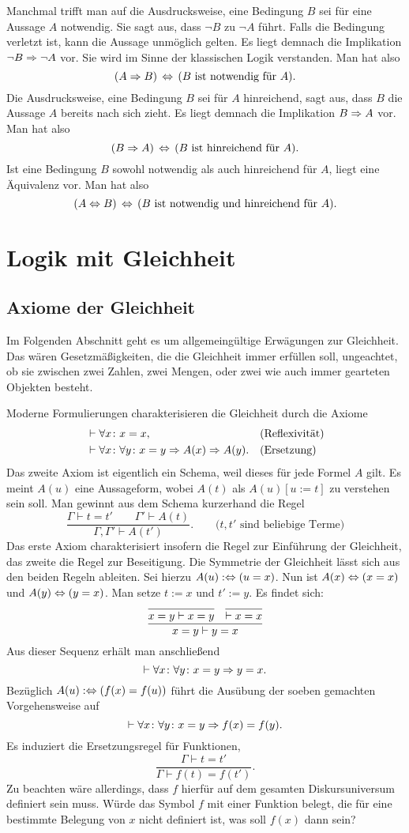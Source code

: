 Manchmal trifft man auf die Ausdrucksweise, eine Bedingung $B$ sei für
eine Aussage $A$ notwendig. Sie sagt aus, dass $\lnot B$ zu $\lnot A$
führt. Falls die Bedingung verletzt ist, kann die Aussage unmöglich
gelten. Es liegt demnach die Implikation $\lnot B\Rightarrow\lnot A$ vor.
Sie wird im Sinne der klassischen Logik verstanden. Man hat also
\[(A\Rightarrow B)\,\Leftrightarrow\, (\text{$B$ ist notwendig für $A$}).\]
Die Ausdrucksweise, eine Bedingung $B$ sei für $A$ hinreichend,
sagt aus, dass $B$ die Aussage $A$ bereits nach sich zieht. Es liegt
demnach die Implikation $B\Rightarrow A$ vor. Man hat also
\[(B\Rightarrow A)\,\Leftrightarrow\, (\text{$B$ ist hinreichend für $A$}).\]
Ist eine Bedingung $B$ sowohl notwendig als auch hinreichend für $A$,
liegt eine Äquivalenz vor. Man hat also
\[(A\Leftrightarrow B)\,\Leftrightarrow\, (\text{$B$ ist notwendig und hinreichend für $A$}).\]

\newpage
\section{Logik mit Gleichheit}

\subsection{Axiome der Gleichheit}

Im Folgenden Abschnitt geht es um allgemeingültige Erwägungen zur
Gleichheit. Das wären Gesetzmäßigkeiten, die die Gleichheit immer
erfüllen soll, ungeachtet, ob sie zwischen zwei Zahlen, zwei Mengen,
oder zwei wie auch immer gearteten Objekten besteht.

Moderne Formulierungen charakterisieren die Gleichheit durch die Axiome
\begin{align*}
&\vdash\forall x\colon x=x, &&\text{(Reflexivität)}\\
&\vdash\forall x\colon\forall y\colon x=y\Rightarrow A(x)\Rightarrow A(y).
&&\text{(Ersetzung)}
\end{align*}
Das zweite Axiom ist eigentlich ein Schema, weil dieses für jede
Formel $A$ gilt. Es meint $A(u)$ eine Aussageform, wobei $A(t)$ als
$A(u)[u:=t]$ zu verstehen sein soll. Man gewinnt aus dem Schema
kurzerhand die Regel
\[\dfrac{\Gamma\vdash t=t'\qquad\Gamma'\vdash A(t)}
{\Gamma,\Gamma'\vdash A(t')}.\qquad\text{($t,t'$ sind beliebige Terme)}\]
Das erste Axiom charakterisiert insofern die Regel zur Einführung
der Gleichheit, das zweite die Regel zur Beseitigung. Die Symmetrie
der Gleichheit lässt sich aus den beiden Regeln ableiten. Sei hierzu
$A(u):\Leftrightarrow (u=x)$. Nun ist $A(x)\Leftrightarrow (x=x)$ und
$A(y)\Leftrightarrow (y=x)$. Man setze $t:=x$ und $t':=y$. Es findet sich:
\[
\infer{x=y\vdash y=x}{
  \infer{x=y\vdash x=y}{}
& \infer{\vdash x=x}{}}
\]
Aus dieser Sequenz erhält man anschließend
\[\vdash\forall x\colon\forall y\colon x=y\Rightarrow y=x.\]
Bezüglich $A(u):\Leftrightarrow (f(x)=f(u))$ führt die Ausübung der soeben
gemachten Vorgehensweise auf
\[\vdash\forall x\colon\forall y\colon x=y\Rightarrow f(x)=f(y).\]
Es induziert die Ersetzungsregel für Funktionen,
\[\dfrac{\Gamma\vdash t=t'}{\Gamma\vdash f(t)=f(t')}.\]
Zu beachten wäre allerdings, dass $f$ hierfür auf dem gesamten
Diskursuniversum definiert sein muss. Würde das Symbol $f$ mit einer
Funktion belegt, die für eine bestimmte Belegung von $x$ nicht definiert
ist, was soll $f(x)$ dann sein?


